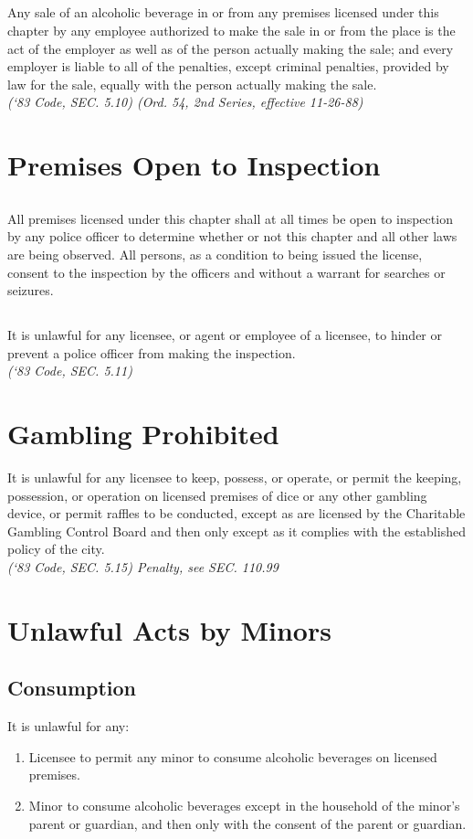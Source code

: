 \subsection{}
Any sale of an alcoholic beverage in or from any premises licensed under this chapter by any employee authorized to make the sale in or from the place is the act of the employer as well as of the person actually making the sale; and every employer is liable to all of the penalties, except criminal penalties, provided by law for the sale, equally with the person actually making the sale.\\
\emph{(‘83 Code, SEC. 5.10)  (Ord. 54, 2nd Series, effective 11-26-88)}
\section{Premises Open to Inspection}
\subsection{}
All premises licensed under this chapter shall at all times be open to inspection by any police officer to determine whether or not this chapter and all other laws are being observed.  All persons, as a condition to being issued the license, consent to the inspection by the officers and without a warrant for searches or seizures.
\subsection{}
It is unlawful for any licensee, or agent or employee of a licensee, to hinder or prevent a police officer from making the inspection.\\
\emph{(‘83 Code, SEC. 5.11)}
\section{Gambling Prohibited}
It is unlawful for any licensee to keep, possess, or operate, or permit the keeping, possession, or operation on licensed premises of dice or any other gambling device, or permit raffles to be conducted, except as are licensed by the Charitable Gambling Control Board and then only except as it complies with the established policy of the city.\\
\emph{(‘83 Code, SEC. 5.15)  Penalty, see SEC. 110.99}
\section{Unlawful Acts by Minors}
\subsection{Consumption}
It is unlawful for any:
\begin{enumerate}[{\indent}1)]
    \item Licensee to permit any minor to consume alcoholic beverages on licensed premises.
    \item Minor to consume alcoholic beverages except in the household of the minor’s parent or guardian, and then only with the consent of the parent or guardian.
\end{enumerate}
